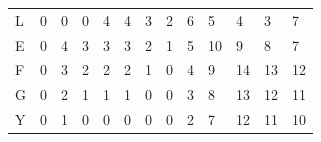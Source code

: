 \documentclass{bredelebeamer}
\begin{document}
\begin{frame}
\begin{table}[]
\begin{tabular}{lllllllllllll}
\multicolumn{1}{l|}{L}  & \multicolumn{1}{l|}{0} & \multicolumn{1}{l|}{0} & \multicolumn{1}{l|}{0} & \multicolumn{1}{l|}{4} & \multicolumn{1}{l|}{4}                         & \multicolumn{1}{l|}{3}                         & \multicolumn{1}{l|}{2}                         & \multicolumn{1}{l|}{\cellcolor[HTML]{3166FF}6} & \multicolumn{1}{l|}{5}                          & \multicolumn{1}{l|}{4}                          & \multicolumn{1}{l|}{3}  & \multicolumn{1}{l|}{7}  \\ \cline{2-13} 
\multicolumn{1}{l|}{E}  & \multicolumn{1}{l|}{0} & \multicolumn{1}{l|}{4} & \multicolumn{1}{l|}{3} & \multicolumn{1}{l|}{3} & \multicolumn{1}{l|}{3}                         & \multicolumn{1}{l|}{2}                         & \multicolumn{1}{l|}{1}                         & \multicolumn{1}{l|}{5}                         & \multicolumn{1}{l|}{\cellcolor[HTML]{3166FF}10} & \multicolumn{1}{l|}{9}                          & \multicolumn{1}{l|}{8}  & \multicolumn{1}{l|}{7}  \\ \cline{2-13} 
\multicolumn{1}{l|}{F}  & \multicolumn{1}{l|}{0} & \multicolumn{1}{l|}{3} & \multicolumn{1}{l|}{2} & \multicolumn{1}{l|}{2} & \multicolumn{1}{l|}{2}                         & \multicolumn{1}{l|}{1}                         & \multicolumn{1}{l|}{0}                         & \multicolumn{1}{l|}{4}                         & \multicolumn{1}{l|}{9}                          & \multicolumn{1}{l|}{\cellcolor[HTML]{3166FF}14} & \multicolumn{1}{l|}{13} & \multicolumn{1}{l|}{12} \\ \cline{2-13} 
\multicolumn{1}{l|}{G}  & \multicolumn{1}{l|}{0} & \multicolumn{1}{l|}{2} & \multicolumn{1}{l|}{1} & \multicolumn{1}{l|}{1} & \multicolumn{1}{l|}{1}                         & \multicolumn{1}{l|}{0}                         & \multicolumn{1}{l|}{0}                         & \multicolumn{1}{l|}{3}                         & \multicolumn{1}{l|}{8}                          & \multicolumn{1}{l|}{13}                         & \multicolumn{1}{l|}{12} & \multicolumn{1}{l|}{11} \\ \cline{2-13} 
\multicolumn{1}{l|}{Y}  & \multicolumn{1}{l|}{0} & \multicolumn{1}{l|}{1} & \multicolumn{1}{l|}{0} & \multicolumn{1}{l|}{0} & \multicolumn{1}{l|}{0}                         & \multicolumn{1}{l|}{0}                         & \multicolumn{1}{l|}{0}                         & \multicolumn{1}{l|}{2}                         & \multicolumn{1}{l|}{7}                          & \multicolumn{1}{l|}{12}                         & \multicolumn{1}{l|}{11} & \multicolumn{1}{l|}{10} \\ \cline{2-13} 
\end{tabular}
\end{table}
\end{frame}
\end{document}
